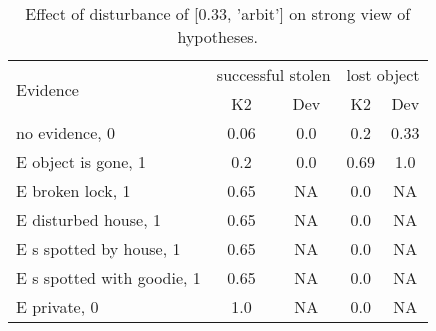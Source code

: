 \begin{table}\begin{tabular}{l|cc|cc}\toprule\multirow{2}{*}{Evidence} & \multicolumn{2}{c}{successful stolen}& \multicolumn{2}{c}{lost object}\\& {K2} & {Dev}& {K2} & {Dev}\\\midrule
no evidence, 0 & \cellcolor{Bittersweet}0.06&\cellcolor{Bittersweet}0.0&\cellcolor{Bittersweet}0.2&\cellcolor{Bittersweet}0.33\\E object is gone, 1 & \cellcolor{Bittersweet}0.2&\cellcolor{Bittersweet}0.0&\cellcolor{Bittersweet}0.69&\cellcolor{Bittersweet}1.0\\E broken lock, 1 & \cellcolor{Bittersweet}0.65&\cellcolor{Bittersweet}NA&\cellcolor{Bittersweet}0.0&\cellcolor{Bittersweet}NA\\E disturbed house, 1 & \cellcolor{Bittersweet}0.65&\cellcolor{Bittersweet}NA&\cellcolor{Bittersweet}0.0&\cellcolor{Bittersweet}NA\\E s spotted by house, 1 & \cellcolor{Bittersweet}0.65&\cellcolor{Bittersweet}NA&\cellcolor{Bittersweet}0.0&\cellcolor{Bittersweet}NA\\E s spotted with goodie, 1 & \cellcolor{Bittersweet}0.65&\cellcolor{Bittersweet}NA&\cellcolor{Bittersweet}0.0&\cellcolor{Bittersweet}NA\\E private, 0 & \cellcolor{Bittersweet}1.0&\cellcolor{Bittersweet}NA&\cellcolor{Bittersweet}0.0&\cellcolor{Bittersweet}NA\\\bottomrule\end{tabular}\caption{Effect of disturbance of [0.33, 'arbit'] on strong view of hypotheses.}\end{table}
